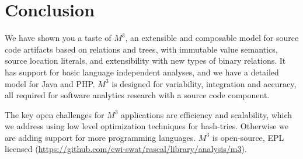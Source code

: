 \documentclass[conference]{IEEEtran}
\newcommand{\mthree}{\ensuremath{M^3}\!\xspace}
\begin{document}
\section{Conclusion}

We have shown you a taste of \mthree, an extensible and composable model for
source code artifacts based on relations and trees, with immutable value
semantics, source location literals, and extensibility with new types of binary relations. It has
support for basic language independent analyses, and we have a detailed model
for Java and PHP. \mthree is designed for variability, integration and accuracy, all required for software analytics research with a source code component.


The key open challenges for \mthree applications are efficiency and scalability, which we address using low level optimization techniques for hash-tries. Otherwise we are adding support for more programming languages. \mthree is open-source, EPL licensed (\href{https://github.com/cwi-swat/rascal/tree/master/src/org/rascalmpl/library/analysis/m3}{https://github.com/cwi-swat/rascal/library/analysis/m3}).



\end{document}
